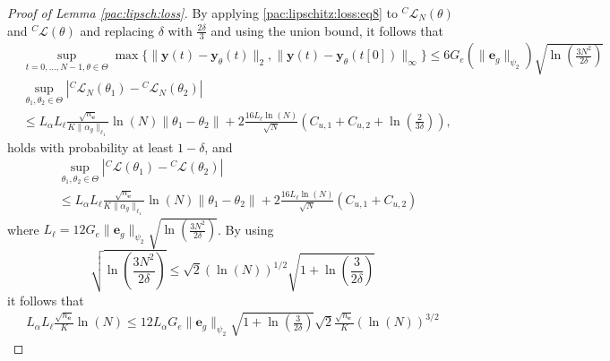 \documentclass{article}
\newcommand{\e}{\mathbf{e}}
\newcommand{\y}{\mathbf{y}}
\begin{document}
\begin{proof}[Proof of Lemma \ref{pac:lipsch:loss}]
   By applying \eqref{pac:lipschitz:loss:eq8} to ${}^C \mathcal{L}_N(\theta)$ and ${}^C \mathcal{L}(\theta)$
   and replacing $\delta$ with $\frac{2\delta}{3}$ and using the union bound, it follows that
\begin{equation}
  \label{quadratic:lipschitz:eq3}
  \begin{aligned}
   & \sup_{t=0,\ldots,N-1,\theta \in \Theta} \max\{\|\y(t)-\y_{\theta}(t)\|_2, \|\y(t)-\y_{\theta}(t[0])\|_\infty\} \le 6G_e (\|\e_g\|_{\psi_2})\sqrt{\ln\left(\frac{3N^2}{2\delta}\right)} \\
    &      \sup_{\theta_1,\theta_2 \in \Theta}\left|{}^C \mathcal{L}_N(\theta_1) - {}^C \mathcal{L}_N(\theta_2)\right| \\
         & \le L_{\alpha}L_{\ell}\frac{\sqrt{n_\e}}{K\|\alpha_g\|_{\ell_1}} \ln(N) \|\theta_1 - \theta_2\|
           +  2\frac{16L_{\ell}\ln(N)}{\sqrt{N}}\left(C_{u,1} + C_{u,2}+\ln\left(\frac{2}{3\delta}\right)\right), 
  \end{aligned}
\end{equation}
holds with probability at least $1-\delta$, and
\begin{equation}
  \begin{aligned}
        &  \sup_{\theta_1,\theta_2 \in \Theta} \left|{}^C \mathcal{L}(\theta_1) - {}^C \mathcal{L}(\theta_2)\right| \\
        & \le L_{\alpha}L_{\ell}\frac{\sqrt{n_\e}}{K\|\alpha_g\|_{\ell_1}} \ln(N) \|\theta_1 - \theta_2\|
          + 2\frac{16L_{\ell}\ln(N)}{\sqrt{N}}\left(C_{u,1} + C_{u,2}\right)
   \end{aligned}
   \end{equation}
     where 
    $L_{\ell}=12G_e \|\e_g\|_{\psi_2} \sqrt{\ln\left(\frac{3N^2}{2\delta}\right)}$. 
    By using 
    \[ \sqrt{\ln\left(\frac{3N^2}{2\delta}\right)} \le \sqrt{2}(\ln(N))^{1/2} \sqrt{1+\ln\left(\frac{3}{2\delta}\right)} \]
    it follows that 
    \begin{align*}
        L_{\alpha}L_{\ell}\frac{\sqrt{n_\e}}{K} \ln(N)  \le
        12 L_{\alpha}G_e \|\e_g\|_{\psi_2} \sqrt{1+\ln\left(\frac{3}{2\delta}\right)}\sqrt{2}\frac{\sqrt{n_\e}}{K}
        (\ln(N))^{3/2}

\end{align*}
\end{proof}
\end{document}
